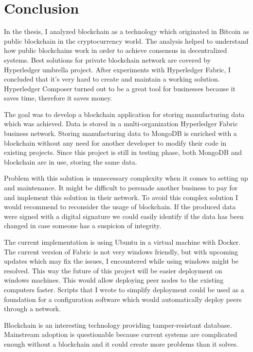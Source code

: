 \chapter*{Conclusion}
In the thesis, I analyzed blockchain as a technology which originated in Bitcoin as public blockchain in the cryptocurrency world. The analysis helped to understand how public blockchains work in order to achieve consensus in decentralized systems. Best solutions for private blockchain network are covered by Hyperledger umbrella project. After experiments with Hyperledger Fabric, I concluded that it's very hard to create and maintain a working solution. Hyperledger Composer turned out to be a great tool for businesses because it saves time, therefore it saves money.  

The goal was to develop a blockchain application for storing manufacturing data which was achieved. Data is stored in a multi-organization Hyperledger Fabric business network. Storing manufacturing data to MongoDB is enriched with a blockchain without any need for another developer to modify their code in existing projects. Since this project is still in testing phase, both MongoDB and blockchain are in use, storing the same data. 

Problem with this solution is unnecessary complexity when it comes to setting up and maintenance. It might be difficult to persuade another business to pay for and implement this solution in their network. To avoid this complex solution I would recommend to reconsider the usage of blockchain. If the produced data were signed with a digital signature we could easily identify if the data has been changed in case someone has a suspicion of integrity. 

The current implementation is using Ubuntu in a virtual machine with Docker. The current version of Fabric is not very windows friendly, but with upcoming updates which may fix the issues, I encountered while using windows might be resolved. This way the future of this project will be easier deployment on windows machines. This would allow deploying peer nodes to the existing computers faster. Scripts that I wrote to simplify deployment could be used as a foundation for a configuration software which would automatically deploy peers through a network. 

Blockchain is an interesting technology providing tamper-resistant database. Mainstream adoption is questionable because current systems are complicated enough without a blockchain and it could create more problems than it solves.